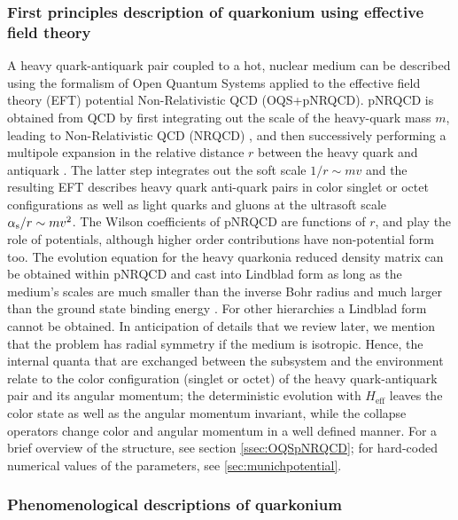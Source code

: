 \documentclass[times,sort&compress,final]{elsarticle}
\def\als{\alpha_{\rm s}}
\begin{document}
\subsubsection{First principles description of quarkonium using effective field theory}
\label{sec:1stprinciple}

A heavy quark-antiquark pair coupled to a hot, nuclear medium can be described using the formalism of Open Quantum Systems 
applied to the effective field theory (EFT) potential Non-Relativistic QCD (OQS+pNRQCD).
pNRQCD is obtained from QCD by first integrating out the scale of the heavy-quark mass $m$, leading 
to Non-Relativistic QCD (NRQCD) \cite{Caswell:1985ui,Bodwin:1994jh,Pineda:1997bj}, and then successively performing a multipole expansion in the 
relative distance $r$ between the heavy quark and antiquark \cite{Pineda:1997bj, Brambilla:1999xf}. The latter 
step integrates out the soft scale $1/r \sim mv$ and the resulting EFT describes heavy quark anti-quark pairs in 
color singlet or octet configurations as well as light quarks and gluons at the ultrasoft scale $\als/r \sim mv^2$. 
The Wilson coefficients of pNRQCD are functions of $r$, and play the role of potentials, although higher order contributions have non-potential form too.
The evolution equation for the heavy quarkonia reduced density matrix can be obtained within pNRQCD and cast into Lindblad form as long 
as the medium's scales are much smaller than the inverse Bohr radius and much larger than the ground state binding 
energy \cite{Brambilla:2016wgg,Brambilla:2017zei}.  
For other hierarchies a Lindblad form cannot be obtained. 
In anticipation of details that we review later, we mention that the problem 
has radial symmetry if the medium is isotropic. 
Hence, the internal quanta that are exchanged between the subsystem and the 
environment relate to the color configuration (singlet or octet) of the heavy 
quark-antiquark pair and its angular momentum; the deterministic evolution 
with $H_\text{eff}$ leaves the color state as well as the angular momentum 
invariant, while the collapse operators change color and angular momentum in 
a well defined manner.
For a brief overview of the structure, see section \ref{ssec:OQSpNRQCD}; for 
hard-coded numerical values of the parameters, see \ref{sec:munichpotential}.

\subsubsection{Phenomenological descriptions of quarkonium}
\label{sec:pheno}
\end{document}
